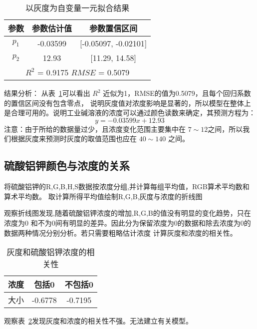     \begin{table}[H]
        \centering
        \caption{以灰度为自变量一元拟合结果}
        \label{灰度工业碱一元拟合}
        \begin{tabular}{@{}ccc@{}}
        \toprule
        参数       & 参数估计值      & 参数置信区间                     \\ \midrule
        $p_1$    & -0.03599   & {[}-0.05097, -0.02101{]}   \\
        $p_2$    & 12.93      & {[}11.29, 14.58{]}         \\
        \hline
        \multicolumn{3}{c}{$R^2$ = 0.9175 $RMSE$ = 0.5079} \\ \bottomrule
        \end{tabular}
        \end{table}

    结果分析： 从表~\ref{灰度工业碱一元拟合}可以看出 $R^2$ 近似为1，RMSE的值为0.5079，且每个回归系数的置信区间没有包含零点，
    说明灰度值对浓度影响是显著的，所以模型在整体上是合理可用的。说明工业碱溶液的浓度可以通过颜色读数来确定，其预测方程为：
        $$y = -0.03599 x + 12.93 $$
    注意：由于所给的数据量过少，且浓度变化范围主要集中在 $7 \sim 12$之间，所以我们根据灰度来预测时灰度的取值范围也应在 $40 \sim 140$
    之间。
\subsection{硫酸铝钾颜色与浓度的关系}

    将硫酸铝钾的R,G,B,H,S数据按浓度分组,并计算每组平均值，RGB算术平均数和算术平均数。
    取计算所得平均值绘制R,G,B,灰度与浓度的折线图
    
    观察折线图发现,随着硫酸铝钾浓度的增加,R,G,B的值没有明显的变化趋势，只在浓度为0 和不为0间有明显的差异。因此分为保留浓度为0的数据和除去浓度为0的数据两种情况分别分析。若只需要粗略估计浓度
    计算灰度和浓度的相关性。
    \begin{table}[H]
      \centering
      \caption{灰度和硫酸铝钾浓度的相关性}
      \label{硫酸铝钾浓度和灰度}
      \begin{tabular}{@{}ccc@{}}
      \toprule
      浓度 & 包括0     & 不包括0    \\ \midrule
      大小 & -0.6778 & -0.7195 \\ \bottomrule
      \end{tabular}
    \end{table}
    
    观察表~\ref{硫酸铝钾浓度和灰度}发现灰度和浓度的相关性不强。无法建立有关模型。
    
